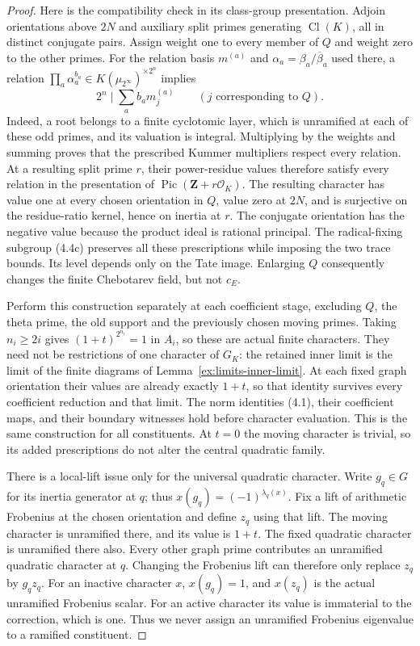 \documentclass[11pt]{article}
\theoremstyle{definition}
\theoremstyle{remark}
\begin{document}
\begin{proof}
Here is the compatibility check in its class-group presentation.
Adjoin orientations above $2N$ and auxiliary split primes generating
$\operatorname{Cl}(K)$, all in distinct conjugate pairs. Assign weight
one to every member of $Q$ and weight zero to the other primes.
For the relation basis $m^{(a)}$ and
$\alpha_a=\beta_a/\overline\beta_a$ used there, a relation
$\prod_a\alpha_a^{b_a}\in
K(\mu_{2^\infty})^{\times 2^n}$ implies
\[
 2^n\mid\sum_a b_am_j^{(a)}\qquad(j\text{ corresponding to }Q).
\]
Indeed, a root belongs to a finite cyclotomic layer, which is
unramified at each of these odd primes, and its valuation is integral.
Multiplying by the weights and summing proves that the prescribed
Kummer multipliers respect every relation. At a resulting split
prime $r$, their power-residue values therefore satisfy every
relation in the presentation of $\operatorname{Pic}(\mathbf Z+r\mathcal
O_K)$. The resulting character has value one at every chosen
orientation in $Q$, value zero at $2N$, and is surjective on the
residue-ratio kernel, hence on inertia at $r$. The conjugate
orientation has the negative value because the product ideal is
rational principal. The radical-fixing subgroup (4.4c) preserves
all these prescriptions while imposing the two trace bounds.
Its level depends only on the Tate image. Enlarging $Q$ consequently
changes the finite Chebotarev field, but not $c_E$.

Perform this construction separately at each coefficient stage,
excluding $Q$, the theta prime, the old support and the previously
chosen moving primes. Taking $n_i\geq2i$ gives
$(1+t)^{2^{n_i}}=1$ in $A_i$, so these are actual finite characters.
They need not be restrictions of one character of $G_K$: the
retained inner limit is the limit of the finite diagrams of
Lemma~\ref{ex:limits-inner-limit}. At each fixed graph orientation
their values are already exactly $1+t$, so that identity survives
every coefficient reduction and that limit. The norm identities
(4.1), their coefficient maps, and their boundary witnesses hold
before character evaluation. This is the same construction for
all constituents. At $t=0$ the moving character is trivial, so
its added prescriptions do not alter the central quadratic family.

There is a local-lift issue only for the universal quadratic
character. Write $g_q\in G$ for its inertia generator at $q$;
thus $x(g_q)=(-1)^{\lambda_q(x)}$. Fix a lift of arithmetic
Frobenius at the chosen orientation and define $z_q$ using that
lift. The moving character is unramified there, and its value is
$1+t$. The fixed quadratic character is unramified there also.
Every other graph prime contributes an unramified quadratic
character at $q$. Changing the Frobenius lift can therefore only
replace $z_q$ by $g_qz_q$. For an inactive character $x$,
$x(g_q)=1$, and $x(z_q)$ is the actual unramified Frobenius scalar.
For an active character its value is immaterial to the correction,
which is one. Thus we never assign an unramified Frobenius
eigenvalue to a ramified constituent.


\end{proof}
\end{document}
